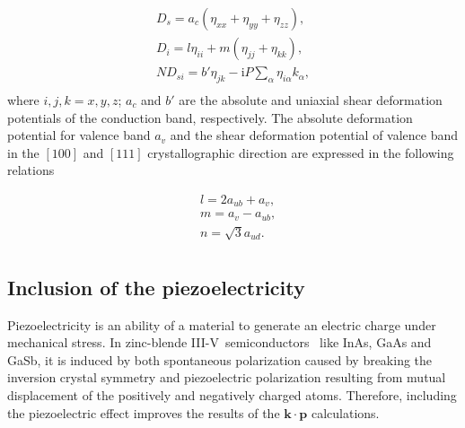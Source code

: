 \begin{eqnarray*}
	D_s=a_c(\eta_{xx}+\eta_{yy}+\eta_{zz}),\nonumber\\
	D_i=l\eta_{ii}+m(\eta_{jj}+\eta_{kk}),\nonumber\\
	ND_{si}=b'\eta_{jk}-\mathrm{i}P\sum_\alpha\eta_{i\alpha}k_\alpha,\nonumber\\
\end{eqnarray*}
where $i,j,k=x,y,z$; $a_c$ and $b'$ are the absolute and uniaxial shear deformation potentials of the conduction band, respectively. The absolute deformation potential for valence band $a_v$ and the shear deformation potential of valence band in the $[100]$ and $[111]$ crystallographic direction are expressed in the following relations

\begin{eqnarray*}
	&l=2a_{ub}+a_v,\nonumber\\
	&m=a_v-a_{ub},\nonumber\\
	&n=\sqrt{3}a_{ud}.\nonumber\\
\end{eqnarray*}





\subsection{Inclusion of the piezoelectricity}
\label{subPiezo}



Piezoelectricity is an ability of a material to generate an electric charge under mechanical stress. In zinc-blende {III-V}~semiconductors~\citep{Hubner,Zeller,Gironcoli,KingSmith} like InAs, GaAs and GaSb, it is induced by both spontaneous polarization caused by breaking the inversion crystal symmetry and piezoelectric polarization resulting from mutual displacement of the positively and negatively charged atoms. Therefore, including the piezoelectric effect improves the results of the $\mathbf{k}\cdot\mathbf{p}$ calculations.


